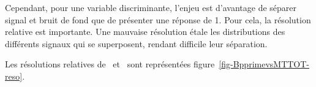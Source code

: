 \par
Cependant,
pour une variable discriminante,
l'enjeu est d'avantage de séparer signal et bruit de fond
que de présenter une réponse de 1.
Pour cela, la résolution relative est importante.
Une mauvaise résolution étale les distributions des différents signaux qui se superposent, rendant difficile leur séparation.
\par
Les résolutions relatives de \mTtot\ et \mml\
sont représentées figure~\ref{fig-BpprimevsMTTOT-reso}.
%
%
%
